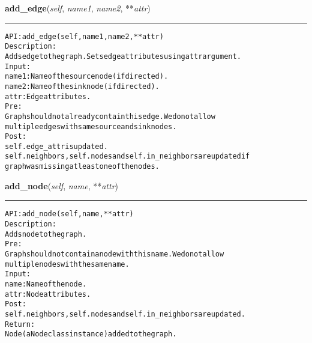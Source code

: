     \label{coinor:gimpy:graph:Graph:add_edge}

    \vspace{0.5ex}

\hspace{.8\funcindent}\begin{boxedminipage}{\funcwidth}

    \raggedright \textbf{add\_edge}(\textit{self}, \textit{name1}, \textit{name2}, **\textit{attr})

    \vspace{-1.5ex}

    \rule{\textwidth}{0.5\fboxrule}
\setlength{\parskip}{2ex}
\begin{alltt}

API: add\_edge(self, name1, name2, **attr)
Description:
Adds edge to the graph. Sets edge attributes using attr argument.
Input:
    name1: Name of the source node (if directed).
    name2: Name of the sink node (if directed).
    attr: Edge attributes.
Pre:
    Graph should not already contain this edge. We do not allow
    multiple edges with same source and sink nodes.
Post:
    self.edge\_attr is updated.
    self.neighbors, self.nodes and self.in\_neighbors are updated if
    graph was missing at least one of the nodes.
\end{alltt}

\setlength{\parskip}{1ex}
    \end{boxedminipage}

    \label{coinor:gimpy:graph:Graph:add_node}

    \vspace{0.5ex}

\hspace{.8\funcindent}\begin{boxedminipage}{\funcwidth}

    \raggedright \textbf{add\_node}(\textit{self}, \textit{name}, **\textit{attr})

    \vspace{-1.5ex}

    \rule{\textwidth}{0.5\fboxrule}
\setlength{\parskip}{2ex}
\begin{alltt}

API: add\_node(self, name, **attr)
Description:
Adds node to the graph.
Pre:
    Graph should not contain a node with this name. We do not allow
    multiple nodes with the same name.
Input:
    name: Name of the node.
    attr: Node attributes.
Post:
    self.neighbors, self.nodes and self.in\_neighbors are updated.
Return:
    Node (a Node class instance) added to the graph.
\end{alltt}

\setlength{\parskip}{1ex}
    \end{boxedminipage}

